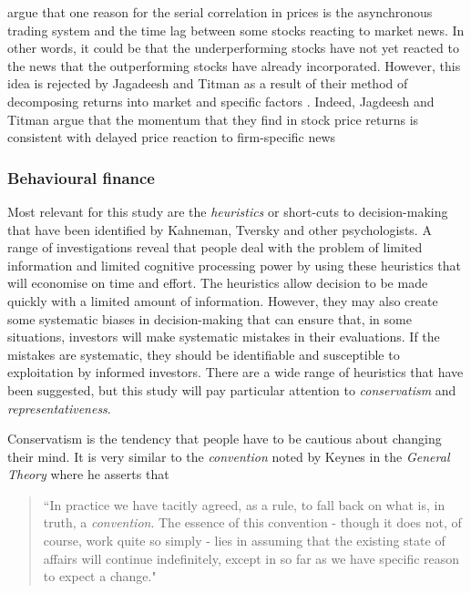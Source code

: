 \documentclass[12pt, a4paper, oneside]{article} %
\begin{document}
\citep{LoMacKinlay1990} argue that one reason for the serial correlation in prices is the asynchronous trading system and the time lag between some stocks reacting to market news.  In other words, it could be that the underperforming stocks have not yet reacted to the news that the outperforming stocks have already incorporated.  However, this idea is rejected by Jagadeesh and Titman as a result of their method of decomposing returns into market and specific factors \citep[p. 73]{Jagadeesh}.  Indeed, Jagdeesh and Titman argue that the momentum that they find in stock price returns is consistent with delayed price reaction to firm-specific news \citep{Jagadeesh} 




\subsubsection{Behavioural finance}

Most relevant for this study are the \emph{heuristics} or short-cuts to decision-making that have been identified by Kahneman, Tversky and other psychologists.   A range of investigations reveal that people deal with the problem of limited information and limited cognitive processing power by using these heuristics  that will economise on time and effort.  The heuristics allow decision to be made quickly with a limited amount of information.  However, they may also create some systematic biases in decision-making that can ensure that, in some situations, investors will make systematic mistakes in their evaluations.  If the mistakes are systematic, they should be identifiable and susceptible to exploitation by informed investors.  There are a wide range of heuristics that have been suggested, but this study will pay particular attention to \emph{conservatism} and \emph{representativeness}.  

Conservatism is the tendency that people have to be cautious about changing their mind.  It is very similar to the \emph{convention} noted by Keynes in the \emph{General Theory} where he asserts that 
\begin{quotation}
``In practice we have tacitly agreed, as a rule, to fall back on what is, in truth, a \emph{convention}.  The essence of this convention - though it does not, of course, work quite so simply - lies in assuming that the existing state of affairs will continue indefinitely, except in so far as we have specific reason to expect a change."
\end{quotation}
\citep[p. 152]{Keynes1936}
\end{document}
